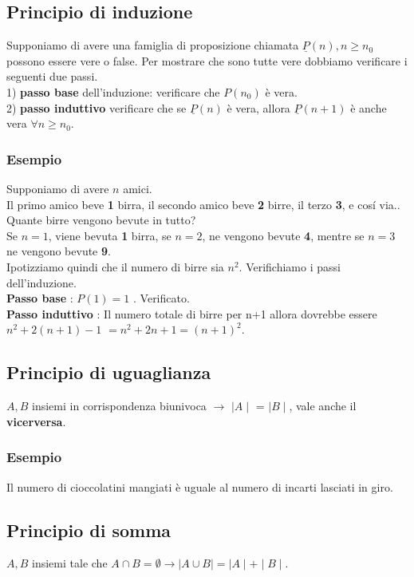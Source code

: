 \documentclass[11pt]{article}
\begin{document}
            \subsection{Principio di induzione }
            Supponiamo di avere una famiglia di proposizione chiamata $\underline{P}(n), n \geq n_0$ possono essere vere o false. Per mostrare che sono tutte vere dobbiamo verificare i seguenti due passi.\\
            1) \textbf{passo base} dell'induzione: verificare che $P(n_0)$ \`e vera.\\
            2) \textbf{passo induttivo} verificare che se $\underline{P}(n)$ \`e vera, allora $\underline{P}(n+1)$ \`e anche vera $\forall n \geq n_0$.
            \subsubsection{Esempio}
            Supponiamo di avere $n$ amici.\\
            Il primo amico beve \textbf{1} birra, il secondo amico beve \textbf{2} birre, il terzo \textbf{3}, e cos\'i via..\hspace{0,35cm}  Quante birre vengono bevute in tutto?\\
            Se $n = 1$, viene bevuta \textbf{1} birra, se $n=2$, ne vengono bevute \textbf{4}, mentre se $n=3$ ne vengono bevute \textbf{9}.\\
            Ipotizziamo quindi che il numero di birre sia $n^2$. Verifichiamo i passi dell'induzione.\\
            \textbf{Passo base} : $P(1)=1$ . Verificato.\\
            \textbf{Passo induttivo} : Il numero totale di birre per n+1 allora dovrebbe essere  $n^2 + 2(n+1) -1$ $= n^2 +2n +1 = (n+1)^2$.
            \subsection{Principio di uguaglianza}
            $A,B$ insiemi in corrispondenza biunivoca $\rightarrow$ $\mid A\mid$ = $\mid B \mid$, vale anche il \textbf{vicerversa}.
            \subsubsection{Esempio}
            Il numero di cioccolatini mangiati \`e uguale al numero di incarti lasciati in giro.
            \subsection{Principio di somma}
            $A,B$ insiemi tale che $A \cap B = \emptyset \rightarrow \mid A \cup B \mid = \mid A \mid + \mid B \mid $.
\end{document}
